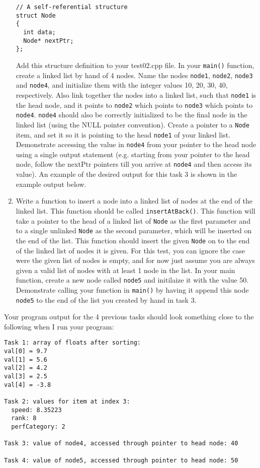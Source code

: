 \documentclass[11pt]{article}
\begin{document}
\begin{enumerate}
\begin{verbatim}
// A self-referential structure
struct Node
{
  int data;
  Node* nextPtr;
};
\end{verbatim}
   Add this structure definition to your test02.cpp file.  In your
   \verb~main()~ function, create a linked list by hand of 4 nodes.  Name
   the nodes \verb~node1~, \verb~node2~, \verb~node3~ and \verb~node4~, and initialize
   them with the integer values 10, 20, 30, 40, respectively.  Also
   link together the nodes into a linked list, such that \verb~node1~ is
   the head node, and it points to \verb~node2~ which points to \verb~node3~
   which points to \verb~node4~.  \verb~node4~ should also be correctly
   initialized to be the final node in the linked list (using the NULL
   pointer convention).  Create a pointer to a \verb~Node~ item, and set it
   so it is pointing to the head \verb~node1~ of your linked list.  Demonstrate
   accessing the value in \verb~node4~ from your pointer to the head node using
   a single output statement (e.g. starting from your pointer to the head
   node, follow the nextPtr pointers till you arrive at \verb~node4~ and then
   access its value).  An example of the desired output for this task
   3 is shown in the example output below.
\item Write a function to insert a node into a linked list of nodes at
   the end of the linked list.  This function should be called
   \verb~insertAtBack()~.  This function will take a pointer to the head of
   a linked list of \verb~Node~ as the first parameter and to a single
   unlinked \verb~Node~ as the second parameter, which will be inserted on
   the end of the list.  This function should insert the given \verb~Node~
   on to the end of the linked list of nodes it is given.  For this
   test, you can ignore the case were the given list of nodes is
   empty, and for now just assume you are always given a valid list of
   nodes with at least 1 node in the list.  In your main function,
   create a new node called \verb~node5~ and initilaize it with the
   value 50.  Demonstrate calling your function in \verb~main()~ by having
   it append this node \verb~node5~ to the end of the list you created by
   hand in task 3.
\end{enumerate}

Your program output for the 4 previous tasks should look something
close to the following when I run your program:


\begin{verbatim}
Task 1: array of floats after sorting:
val[0] = 9.7
val[1] = 5.6
val[2] = 4.2
val[3] = 2.5
val[4] = -3.8

Task 2: values for item at index 3:
  speed: 8.35223
  rank: 8
  perfCategory: 2

Task 3: value of node4, accessed through pointer to head node: 40

Task 4: value of node5, accessed through pointer to head node: 50
\end{verbatim}
\end{document}
